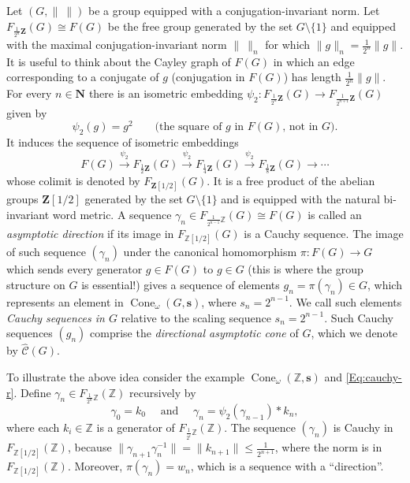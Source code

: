 \documentclass[12pt]{amsart}
\theoremstyle{definition}
\def\ZZ{\ensuremath{\mathbb{Z}}}
\newcommand{\B}[1]{\mathbf{#1}}
\newcommand{\OP}[1]{\operatorname{#1}}
\def\Cone{\OP{Cone}}
\def\Free{F}
\def\tC{\hat{\mathcal{C}}}
\begin{document}
Let $(G,\|\ \|)$ be a group equipped with a conjugation-invariant norm.
Let $F_{\frac{1}{2^n}\B Z}(G)\cong F(G)$ be the free group generated by the set
$G\setminus\{1\}$ and equipped with the maximal conjugation-invariant norm $\|\ \|_{n}$ for
which $\|g\|_{n} = \frac{1}{2^n}\|g\|$. It is useful to think about the Cayley
graph of $F(G)$ in which an edge corresponding to a conjugate of $g$ (conjugation in $F(G)$) has length
$\frac{1}{2^n}\|g\|$.  For every $n\in \B N$ there is an isometric embedding 
$\psi_2\colon F_{\frac{1}{2^n}\B Z}(G) \to F_{\frac{1}{2^{n+1}}\B Z}(G)$ given
by 
$$
\psi_2(g) = g^2\qquad\text{(the square of $g$ in $F(G)$, not in $G$)}.
$$
It induces the sequence of isometric embeddings
$$
F(G) \stackrel{\psi_2}\longrightarrow F_{\frac{1}{2}\B Z}(G)
\stackrel{\psi_2}\longrightarrow F_{\frac{1}{4}\B Z}(G)
\stackrel{\psi_2}\longrightarrow F_{\frac{1}{8}\B Z}(G)\longrightarrow\cdots
$$
whose colimit is denoted by $F_{\B Z[1/2]}(G)$. It is a free product of the
abelian groups $\B Z[1/2]$ generated by the set $G\setminus\{1\}$ and is equipped with the
natural bi-invariant word metric.  A sequence $\gamma_n \in
\Free_{\tfrac{1}{2^{n-1}}\ZZ}(G) \cong \Free(G)$ is called an {\em asymptotic
direction} if its image in $\Free_{\ZZ[1/2]}(G)$ is a Cauchy sequence.
The image of such sequence $(\gamma_n)$ under the canonical homomorphism 
$\pi\colon F(G) \to G$ which sends every generator $g \in F(G)$ to $g \in G$
(this is where the group structure on $G$ is essential!) gives a sequence of
elements $g_n=\pi(\gamma_n) \in G$,
which represents an element in $\Cone_\omega(G,\B s)$, where $s_n=2^{n-1}$.  We
call such elements {\em Cauchy sequences in $G$} relative to the scaling
sequence $s_n=2^{n-1}$.  
Such Cauchy sequences $(g_n)$ comprise the {\em directional
asymptotic cone} of $G$, which we denote by $\tC(G)$.

To illustrate the above idea consider the example $\Cone_{\omega}(\ZZ,\B s)$
and \eqref{Eq:cauchy-r}. Define $\gamma_n\in F_{\frac{1}{2^n}\ZZ}(\ZZ)$ recursively
by
$$
\gamma_0=k_0\quad \text{ and } \quad \gamma_n=\psi_2(\gamma_{n-1})*k_n,
$$
where each $k_i\in \ZZ$ is a generator of $F_{\frac{1}{2^i}\ZZ}(\ZZ)$.
The sequence $(\gamma_n)$ is Cauchy in $F_{\ZZ[1/2]}(\ZZ)$, because
$\|\gamma_{n+1}\gamma_n^{-1}\|=\|k_{n+1}\|\leq \frac{1}{2^{n+1}}$, where
the norm is in $F_{\ZZ[1/2]}(\ZZ)$. Moreover, $\pi(\gamma_n) = w_n$, which
is a sequence with a ``direction''.
\end{document}
